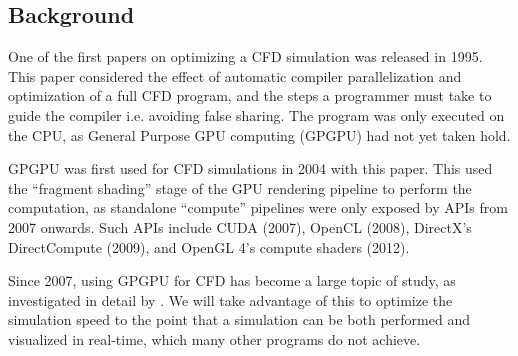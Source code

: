 \subsection{Background}
One of the first papers on optimizing a CFD simulation was released in 1995\cite{paper:1995CfdOpt:1383209}.
This paper considered the effect of automatic compiler parallelization and optimization of a full CFD program, and the steps a programmer must take to guide the compiler i.e. avoiding false sharing.
The program was only executed on the CPU, as General Purpose GPU computing (GPGPU) had not yet taken hold.

GPGPU was first used for CFD simulations in 2004 with this paper\cite{paper:2004CfdGPU:10.1109/SC.2004.26}.
This used the ``fragment shading'' stage of the GPU rendering pipeline to perform the computation, as standalone ``compute'' pipelines were only exposed by APIs from 2007 onwards.
Such APIs include CUDA (2007)\cite{tool:CUDAProgrammingV1}, OpenCL (2008)\cite{tool:OpenCL1.0PressRelease}, DirectX's DirectCompute (2009)\cite{tool:DirectComputePresentation}, and OpenGL 4's compute shaders (2012)\cite{tool:OpenGLComputeShaderExt}.

Since 2007, using GPGPU for CFD has become a large topic of study, as investigated in detail by \cite{paper:GPGPUSummary:10.1007/s11227-013-1015-7}.
We will take advantage of this to optimize the simulation speed to the point that a simulation can be both performed and visualized in real-time, which many other programs do not achieve.
